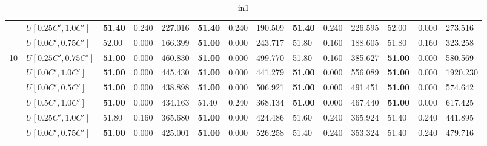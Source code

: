 \begin{table}[h]
{\begin{tabular}{|l|l||l|l|l||l|l|l||l|l|l||l|l|l|}
       & $U[0.25C',1.0C']$ & \textbf{51.40} & 0.240 & 227.016 & \textbf{51.40} & 0.240 & 190.509 & \textbf{51.40} & 0.240 & 226.595 & 52.00 & 0.000 & 273.516 \\
       & $U[0.0C',0.75C']$ & 52.00 & 0.000 & 166.399 & \textbf{51.00} & 0.000 & 243.717 & 51.80 & 0.160 & 188.605 & 51.80 & 0.160 & 323.258 \\
      \hline\hline
      \multirow{6}{*}{10}
       & $U[0.25C',0.75C']$ & \textbf{51.00} & 0.000 & 460.830 & \textbf{51.00} & 0.000 & 499.770 & 51.80 & 0.160 & 385.627 & \textbf{51.00} & 0.000 & 580.569 \\
       & $U[0.0C',1.0C']$ & \textbf{51.00} & 0.000 & 445.430 & \textbf{51.00} & 0.000 & 441.279 & \textbf{51.00} & 0.000 & 556.089 & \textbf{51.00} & 0.000 & 1920.230 \\
       & $U[0.0C',0.5C']$ & \textbf{51.00} & 0.000 & 438.898 & \textbf{51.00} & 0.000 & 506.921 & \textbf{51.00} & 0.000 & 491.451 & \textbf{51.00} & 0.000 & 574.642 \\
       & $U[0.5C',1.0C']$ & \textbf{51.00} & 0.000 & 434.163 & 51.40 & 0.240 & 368.134 & \textbf{51.00} & 0.000 & 467.440 & \textbf{51.00} & 0.000 & 617.425 \\
       & $U[0.25C',1.0C']$ & 51.80 & 0.160 & 365.680 & \textbf{51.00} & 0.000 & 424.486 & 51.60 & 0.240 & 365.924 & 51.40 & 0.240 & 441.895 \\
       & $U[0.0C',0.75C']$ & \textbf{51.00} & 0.000 & 425.001 & \textbf{51.00} & 0.000 & 526.258 & 51.40 & 0.240 & 353.324 & 51.40 & 0.240 & 479.716 \\
      \hline
      \end{tabular}
      }
      \caption{in1}
      \label{tab:in1}\end{table}


